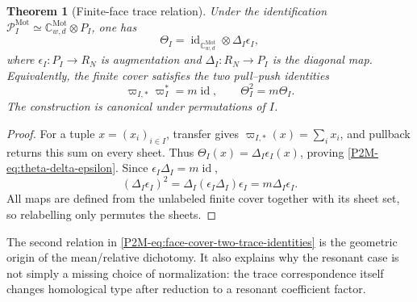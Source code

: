 \documentclass[11pt]{article}
\newtheorem{theorem}{Theorem}[section]
\theoremstyle{remark}
\newcommand{\Mot}{\mathrm{Mot}}
\begin{document}
\begin{theorem}[Finite-face trace relation]
\label{P2M-thm:finite-face-trace-relation}
Under the identification
\(\mathcal P_I^{\Mot}\simeq\mathbb C^{\Mot}_{w,d}\otimes P_I\), one has
\begin{equation}\label{P2M-eq:theta-delta-epsilon}
 \boxed{
 \Theta_I=\operatorname{id}_{\mathbb C^{\Mot}_{w,d}}\otimes
           \Delta_I\epsilon_I,}
\end{equation}
where \(\epsilon_I:P_I\to R_N\) is augmentation and
\(\Delta_I:R_N\to P_I\) is the diagonal map.  Equivalently, the finite
cover satisfies the two pull--push identities
\begin{equation}\label{P2M-eq:face-cover-two-trace-identities}
 \boxed{
 \varpi_{I,*}\varpi_I^*=m\operatorname{id},
 \qquad
 \Theta_I^2=m\Theta_I.}
\end{equation}
The construction is canonical under permutations of \(I\).
\end{theorem}

\begin{proof}
For a tuple \(x=(x_i)_{i\in I}\), transfer gives
\(\varpi_{I,*}(x)=\sum_i x_i\), and pullback returns this sum on every
sheet.  Thus \(\Theta_I(x)=\Delta_I\epsilon_I(x)\), proving
\eqref{P2M-eq:theta-delta-epsilon}.  Since
\(\epsilon_I\Delta_I=m\operatorname{id}\),
\[
 (\Delta_I\epsilon_I)^2
 =\Delta_I(\epsilon_I\Delta_I)\epsilon_I
 =m\Delta_I\epsilon_I.
\]
All maps are defined from the unlabeled finite cover together with its sheet
set, so relabelling only permutes the sheets.
\end{proof}

The second relation in \eqref{P2M-eq:face-cover-two-trace-identities} is the geometric origin of the
mean/relative dichotomy.  It also explains why the resonant case is not simply
a missing choice of normalization: the trace correspondence itself changes
homological type after reduction to a resonant coefficient factor.
\end{document}

